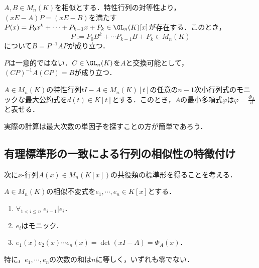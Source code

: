 \documentclass[uplatex, dvipdfmx]{jsreport}
\begin{document}
\begin{corollary}[変換行列の対応]
    $A,B\in M_n(K)$を相似とする．特性行列の対等性より，$(xE-A)P=(xE-B)$を満たす$P(x)=P_0x^k+\cdots+P_{k-1}x+P_k\in\GL_n(K)[x]$が存在する．このとき，
    \[P:=P_0B^k+\cdots P_{k-1}B+P_k\in M_n(K)\]
    について$B=P^{-1}AP$が成り立つ．
\end{corollary}
\begin{remark}
    $P$は一意的ではない．$C\in\GL_n(K)$を$A$と交換可能として，$(CP)^{-1}A(CP)=B$が成り立つ．
\end{remark}

\begin{corollary}[最小多項式の特徴付けと有理的に求められること]
    $A\in M_n(K)$の特性行列$tI-A\in M_n(K)[t]$の任意の$n-1$次小行列式のモニックな最大公約式を$d(t)\in K[t]$とする．このとき，$A$の最小多項式$\varphi$は$\varphi=\frac{\Phi_A}{d}$と表せる．
\end{corollary}
\begin{remark}
    実際の計算は最大次数の単因子を探すことの方が簡単であろう．
\end{remark}

\subsection{有理標準形の一致による行列の相似性の特徴付け}

\begin{tcolorbox}[colframe=ForestGreen, colback=ForestGreen!10!white,breakable,colbacktitle=ForestGreen!40!white,coltitle=black,fonttitle=\bfseries\sffamily,
title=]
    次に$x$-行列$A(x)\in M_n(K[x])$の共役類の標準形を得ることを考える．
\end{tcolorbox}

\begin{theorem}[固有多項式の特徴付け]
    $A\in M_n(K)$の相似不変式を$e_1,\cdots,e_n\in K[x]$とする．
    \begin{enumerate}
        \item $\forall_{1<i\le n}\;e_{i-1}|e_i$．
        \item $e_i$はモニック．
        \item $e_1(x)e_2(x)\cdots e_n(x)=\det(xI-A)=\Phi_A(x)$．
    \end{enumerate}
    特に，$e_1,\cdots,e_n$の次数の和は$n$に等しく，いずれも零でない．
\end{theorem}
\end{document}
